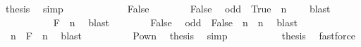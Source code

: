 \begin{isabellebody}
\ {\isacharquery}{\kern0pt}thesis\ \isamarkupfalse%
\ simp\isanewline
\ \ \ \ \isamarkupfalse%
\isanewline
\ \ \ \ \ \ \isamarkupfalse%
\ False\isanewline
\ \ \ \ \ \ \isamarkupfalse%
\ False\ \isamarkupfalse%
\ {\isachardoublequoteopen}{\isacharparenleft}{\kern0pt}odd\ {\isacharminus}{\kern0pt}{\isacharbackquote}{\kern0pt}\ {\isacharbraceleft}{\kern0pt}True{\isacharbraceright}{\kern0pt}{\isacharparenright}{\kern0pt}\ {\isasyminter}\ {\isacharbraceleft}{\kern0pt}n{\isacharbraceright}{\kern0pt}\ {\isacharequal}{\kern0pt}\ {\isacharbraceleft}{\kern0pt}{\isacharbraceright}{\kern0pt}{\isachardoublequoteclose}\ \isamarkupfalse%
\ blast\isanewline
\ \ \ \ \ \ \isamarkupfalse%
\ {}{\isacharcolon}{\kern0pt}\ {\isachardoublequoteopen}{\isacharbraceleft}{\kern0pt}{\isacharbraceright}{\kern0pt}\ {\isasymin}\ {\isacharquery}{\kern0pt}F\ {\isasyminter}{\isacharasterisk}{\kern0pt}\ {\isacharbraceleft}{\kern0pt}n{\isacharbraceright}{\kern0pt}{\isachardoublequoteclose}\ \isamarkupfalse%
\ blast\isanewline
\ \ \ \ \ \ \isamarkupfalse%
\ False\ \isamarkupfalse%
\ {\isachardoublequoteopen}{\isacharparenleft}{\kern0pt}odd\ {\isacharminus}{\kern0pt}{\isacharbackquote}{\kern0pt}\ {\isacharbraceleft}{\kern0pt}False{\isacharbraceright}{\kern0pt}{\isacharparenright}{\kern0pt}\ {\isasyminter}\ {\isacharbraceleft}{\kern0pt}n{\isacharbraceright}{\kern0pt}\ {\isacharequal}{\kern0pt}\ {\isacharbraceleft}{\kern0pt}n{\isacharbraceright}{\kern0pt}{\isachardoublequoteclose}\ \isamarkupfalse%
\ blast\isanewline
\ \ \ \ \ \ \isamarkupfalse%
\ {}{\isacharcolon}{\kern0pt}\ {\isachardoublequoteopen}{\isacharbraceleft}{\kern0pt}n{\isacharbraceright}{\kern0pt}\ {\isasymin}\ {\isacharquery}{\kern0pt}F\ {\isasyminter}{\isacharasterisk}{\kern0pt}\ {\isacharbraceleft}{\kern0pt}n{\isacharbraceright}{\kern0pt}{\isachardoublequoteclose}\ \isamarkupfalse%
\ blast\isanewline
\ \ \ \ \ \ \isamarkupfalse%
\ {}\ {}\ Pow{\isacharunderscore}{\kern0pt}n\ \isamarkupfalse%
\ {\isacharquery}{\kern0pt}thesis\ \isamarkupfalse%
\ simp\isanewline
\ \ \ \ \isamarkupfalse%
\isanewline
\ \ \ \ \isamarkupfalse%
\ {\isacharquery}{\kern0pt}thesis\ \isamarkupfalse%
\ fastforce\isanewline
\ \ \isamarkupfalse%
\isanewline
\ \ \isamarkupfalse%

\end{isabellebody}
